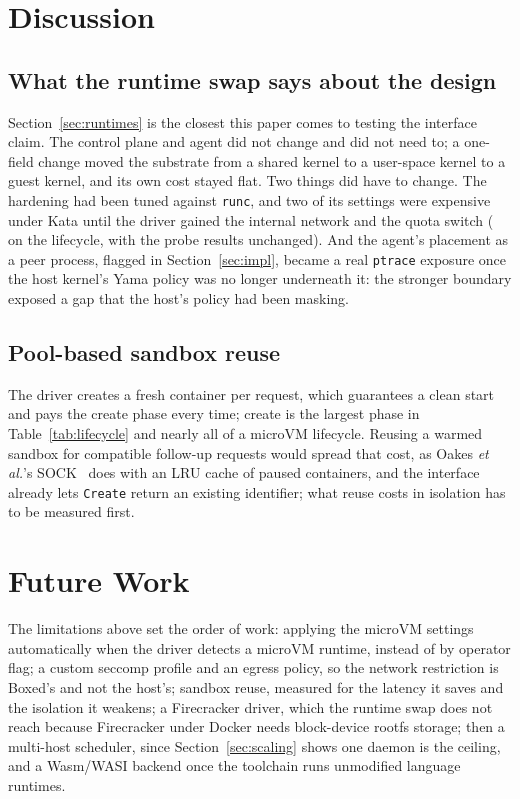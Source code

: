 \documentclass[conference]{IEEEtran}
\begin{document}
\section{Discussion}\label{sec:disc}

\subsection{What the runtime swap says about the design}
Section~\ref{sec:runtimes} is the closest this paper comes to testing the
interface claim. The control plane and agent did not change and did not
need to; a one-field change moved the substrate from a shared kernel to a
user-space kernel to a guest kernel, and its own cost stayed flat. Two
things did have to change. The hardening had been tuned against
\texttt{runc}, and two of its settings were expensive under Kata until the
driver gained the internal network and the quota switch
(\KataAwareSpeedup{} on the lifecycle, with the probe results unchanged).
And the agent's placement as a peer process, flagged in
Section~\ref{sec:impl}, became a real \texttt{ptrace} exposure once the
host kernel's Yama policy was no longer underneath it: the stronger
boundary exposed a gap that the host's policy had been masking.

\subsection{Pool-based sandbox reuse}
The driver creates a fresh container per request, which guarantees a clean
start and pays the create phase every time; create is the largest phase in
Table~\ref{tab:lifecycle} and nearly all of a microVM lifecycle. Reusing a
warmed sandbox for compatible follow-up requests would spread that cost, as
Oakes \emph{et al.}'s SOCK~\cite{sock} does with an LRU cache of paused
containers, and the interface already lets \texttt{Create} return an
existing identifier; what reuse costs in isolation has to be measured
first.

\section{Future Work}\label{sec:future}

The limitations above set the order of work: applying the microVM
settings automatically when the driver detects a microVM runtime, instead
of by operator flag; a custom seccomp profile and an egress policy, so the network
restriction is Boxed's and not the host's; sandbox reuse, measured for the
latency it saves and the isolation it weakens; a Firecracker driver, which
the runtime swap does not reach because Firecracker under Docker needs
block-device rootfs storage; then a multi-host scheduler, since
Section~\ref{sec:scaling} shows one daemon is the ceiling, and a Wasm/WASI
backend once the toolchain runs unmodified language runtimes.
\end{document}
